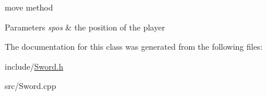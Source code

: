 move method 


\begin{DoxyParams}{Parameters}
{\em spos} & the position of the player \\
\hline
\end{DoxyParams}


The documentation for this class was generated from the following files\-:\begin{DoxyCompactItemize}
\item 
include/\hyperlink{_sword_8h}{Sword.\-h}\item 
src/Sword.\-cpp\end{DoxyCompactItemize}
